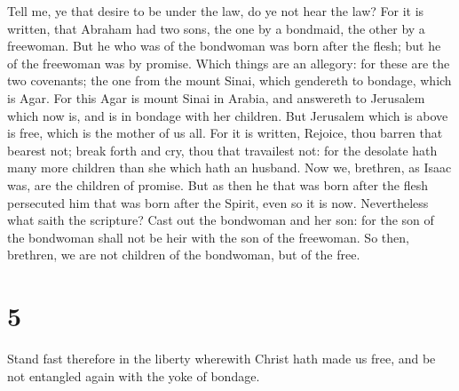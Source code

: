  Tell me, ye that desire to be under the law, do ye not
hear the law?  For it is written, that Abraham had two
sons, the one by a bondmaid, the other by a freewoman. 
But he who was of the bondwoman was born after the flesh; but he of the
freewoman was by promise.  Which things are an allegory:
for these are the two covenants; the one from the mount Sinai, which
gendereth to bondage, which is Agar.  For this Agar is
mount Sinai in Arabia, and answereth to Jerusalem which now is, and is
in bondage with her children.  But Jerusalem which is
above is free, which is the mother of us all.  For it is
written, Rejoice, thou barren that bearest not; break forth and cry,
thou that travailest not: for the desolate hath many more children than
she which hath an husband.  Now we, brethren, as Isaac
was, are the children of promise.  But as then he that
was born after the flesh persecuted him that was born after the Spirit,
even so it is now.  Nevertheless what saith the
scripture? Cast out the bondwoman and her son: for the son of the
bondwoman shall not be heir with the son of the freewoman.
 So then, brethren, we are not children of the bondwoman,
but of the free.

\hypertarget{section-4}{%
\section{5}\label{section-4}}

 Stand fast therefore in the liberty wherewith Christ hath
made us free, and be not entangled again with the yoke of bondage.


